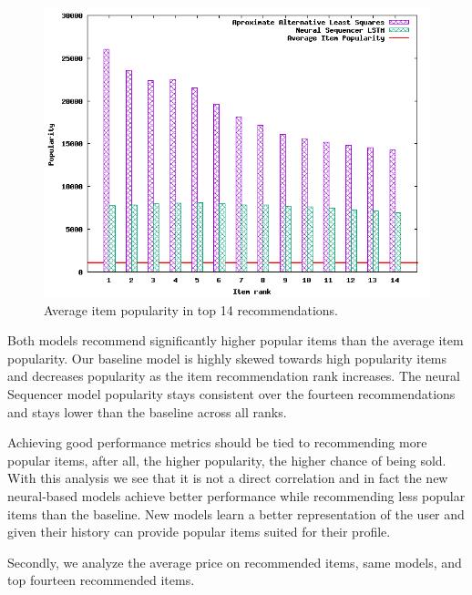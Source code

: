 \documentclass{tex_files/kththesis}
\begin{document}
\begin{figure}[H]
    \centering
    \includegraphics[scale=0.75]{charts/popularity.png}
    \caption{Average item popularity in top 14 recommendations.}
\end{figure}

Both models recommend significantly higher popular items than the average item popularity. Our baseline model is highly skewed towards high popularity items and decreases popularity as the item recommendation rank increases. The neural Sequencer model popularity stays consistent over the fourteen recommendations and stays lower than the baseline across all ranks. 

Achieving good performance metrics should be tied to recommending more popular items, after all, the higher popularity, the higher chance of being sold. With this analysis we see that it is not a direct correlation and in fact the new neural-based models achieve better performance while recommending less popular items than the baseline. New models learn a better representation of the user and given their history can provide popular items suited for their profile. 

Secondly, we analyze the average price on recommended items, same models, and top fourteen recommended items.
\end{document}
